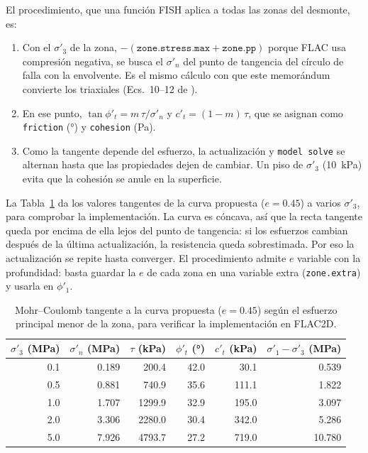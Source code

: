 \documentclass[11pt,letterpaper]{article}
\begin{document}
El procedimiento, que una función FISH aplica a todas las zonas del desmonte, es:
\begin{enumerate}
\item Con el $\sigma'_3$ de la zona, $-(\texttt{zone.stress.max} + \texttt{zone.pp})$ porque FLAC usa compresión negativa, se busca el $\sigma'_n$ del punto de tangencia del círculo de falla con la envolvente. Es el mismo cálculo con que este memorándum convierte los triaxiales (Ecs.~10--12 de \citealp{cylwik}).
\item En ese punto, $\tan\phi'_t = m\,\tau/\sigma'_n$ y $c'_t = (1-m)\,\tau$, que se asignan como \texttt{friction} (°) y \texttt{cohesion} (Pa).
\item Como la tangente depende del esfuerzo, la actualización y \texttt{model solve} se alternan hasta que las propiedades dejen de cambiar. Un piso de $\sigma'_3$ (10~kPa) evita que la cohesión se anule en la superficie.
\end{enumerate}
La Tabla~\ref{tab:flac} da los valores tangentes de la curva propuesta ($e = 0.45$) a varios $\sigma'_3$, para comprobar la implementación. La curva es cóncava, así que la recta tangente queda por encima de ella lejos del punto de tangencia: si los esfuerzos cambian después de la última actualización, la resistencia queda sobrestimada. Por eso la actualización se repite hasta converger. El procedimiento admite $e$ variable con la profundidad: basta guardar la $e$ de cada zona en una variable extra (\texttt{zone.extra}) y usarla en $\phi'_1$.

\begin{table}[!htbp]\centering\small\caption{Mohr--Coulomb tangente a la curva propuesta ($e = 0.45$) según el esfuerzo principal menor de la zona, para verificar la implementación en FLAC2D.}\label{tab:flac}
\begin{tabular}{rrrrrr}\toprule $\sigma'_3$ (MPa) & $\sigma'_n$ (MPa) & $\tau$ (kPa) & $\phi'_t$ (°) & $c'_t$ (kPa) & $\sigma'_1 - \sigma'_3$ (MPa)\\\midrule
0.1 & 0.189 & 200.4 & 42.0 & 30.1 & 0.539 \\
0.5 & 0.881 & 740.9 & 35.6 & 111.1 & 1.822 \\
1.0 & 1.707 & 1299.9 & 32.9 & 195.0 & 3.097 \\
2.0 & 3.306 & 2280.0 & 30.4 & 342.0 & 5.286 \\
5.0 & 7.926 & 4793.7 & 27.2 & 719.0 & 10.780 \\
\bottomrule\end{tabular}\end{table}
\end{document}
